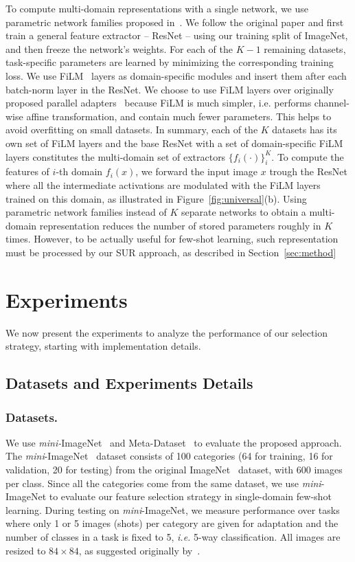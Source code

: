 \documentclass[runningheads]{llncs}
\begin{document}
To compute multi-domain representations with a single network, we use parametric
network families proposed in~\cite{rebuffi2018efficient}. We follow the original
paper and first train a general feature extractor -- ResNet -- using our training
split of ImageNet, and then freeze the network's weights. For each of the $K-1$
remaining datasets, task-specific parameters are learned by minimizing the
corresponding training loss. We use FiLM~\cite{perez2018film} layers as
domain-specific modules and insert them after each batch-norm layer in the
ResNet. We choose to use FiLM layers over originally proposed parallel
adapters~\cite{rebuffi2018efficient} because FiLM is much simpler, i.e. performs
channel-wise affine transformation, and contain much fewer parameters. This
helps to avoid overfitting on small datasets.
In summary, each of the $K$ datasets has
its own set of FiLM layers and the base ResNet with a set of domain-specific FiLM
layers constitutes the multi-domain set of extractors $\{f_i(\cdot)\}_i^{K}$. To
compute the features of $i$-th domain $f_i(x)$, we forward the input image $x$
trough the ResNet where all the intermediate activations are modulated with the
FiLM layers trained on this domain, as illustrated in
Figure~\ref{fig:universal}(b). Using parametric network families instead of $K$
separate networks to obtain a multi-domain representation reduces the number of
stored parameters roughly in $K$ times. However, to be actually useful for
few-shot learning, such representation must be processed by our SUR approach, as
described in Section~\ref{sec:method}

 
\section{Experiments}
We now present the experiments to analyze the performance
of our selection strategy, starting with implementation details.

\subsection{Datasets and Experiments Details}\label{sec:details}
\subsubsection{Datasets.} We use \textit{mini-}ImageNet~\cite{ravioptimization} and 
Meta-Dataset~\cite{triantafillou2019meta} to evaluate the proposed approach. The
\textit{mini}-ImageNet~\cite{ravioptimization} dataset consists of 100 categories (64 for
training, 16 for validation, 20 for testing) from the original
ImageNet~\cite{imagenet} dataset, with 600 images per class. Since all the
categories come from the same dataset, we use \textit{mini}-ImageNet to
evaluate our feature selection strategy in
single-domain few-shot learning. During testing on
\textit{mini}-ImageNet, we measure performance over tasks where only 1 or 5
images (shots) per category are given for adaptation and the number of classes
in a task is fixed to 5, \textit{i.e.} 5-way classification. All images are resized to
$84 \times 84$, as suggested originally by~\cite{ravioptimization}.
\end{document}
